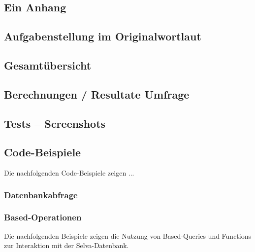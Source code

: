 \begin{appendix} %
\section{Ein Anhang}

\subsection{Aufgabenstellung im Originalwortlaut}

\subsection{Gesamtübersicht}

\subsection{Berechnungen / Resultate Umfrage}

\subsection{Tests – Screenshots}

\subsection{Code-Beispiele} 
Die nachfolgenden Code-Beispiele zeigen ... 

\subsubsection{Datenbankabfrage} 
\label{sec:selva-operationen}




\subsubsection{Based-Operationen}
\label{sec:based-operationen}
Die nachfolgenden Beispiele zeigen die Nutzung von Based-Queries und Functions zur Interaktion mit der Selva-Datenbank.


\end{appendix}
